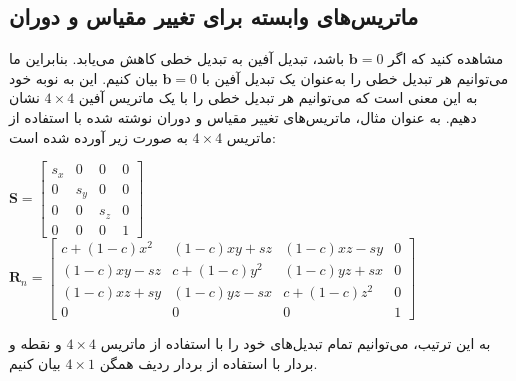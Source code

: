 \subsection{\textbf{ماتریس‌های وابسته برای تغییر مقیاس و دوران}}
\label{subsec:3.2.4}
{
    \Large
    \begin{spacing}{1.5}
        مشاهده کنید که اگر $\textbf{b}=0$ باشد، تبدیل آفین به تبدیل خطی کاهش می‌یابد.
        بنابراین ما می‌توانیم هر تبدیل خطی را به‌عنوان یک تبدیل آفین با $\textbf{b}=0$ بیان کنیم.
        این به نوبه خود به این معنی است که می‌توانیم هر تبدیل خطی را با یک ماتریس آفین $4\times 4$ نشان دهیم.
        به عنوان مثال، ماتریس‌های تغییر مقیاس و دوران نوشته شده با استفاده از ماتریس $4\times 4$ به صورت زیر آورده شده است:

        \begin{center}
            $\textbf{S}=\begin{bmatrix}
                            s_x & 0   & 0   & 0 \\
                            0   & s_y & 0   & 0 \\
                            0   & 0   & s_z & 0 \\
                            0   & 0   & 0   & 1
            \end{bmatrix}$ \\
            $\textbf{R}_{n}=\begin{bmatrix}
                                c+(1-c)x^{2} & (1-c)xy+sz   & (1-c)xz-sy   & 0 \\
                                (1-c)xy-sz   & c+(1-c)y^{2} & (1-c)yz+sx   & 0 \\
                                (1-c)xz+sy   & (1-c)yz-sx   & c+(1-c)z^{2} & 0 \\
                                0            & 0            & 0            & 1
            \end{bmatrix}$
        \end{center}

        به این ترتیب، می‌توانیم تمام تبدیل‌های خود را با استفاده از ماتریس $4\times 4$ و نقطه و بردار با استفاده از بردار ردیف همگن $4\times 1$ بیان کنیم.
    \end{spacing}
}

